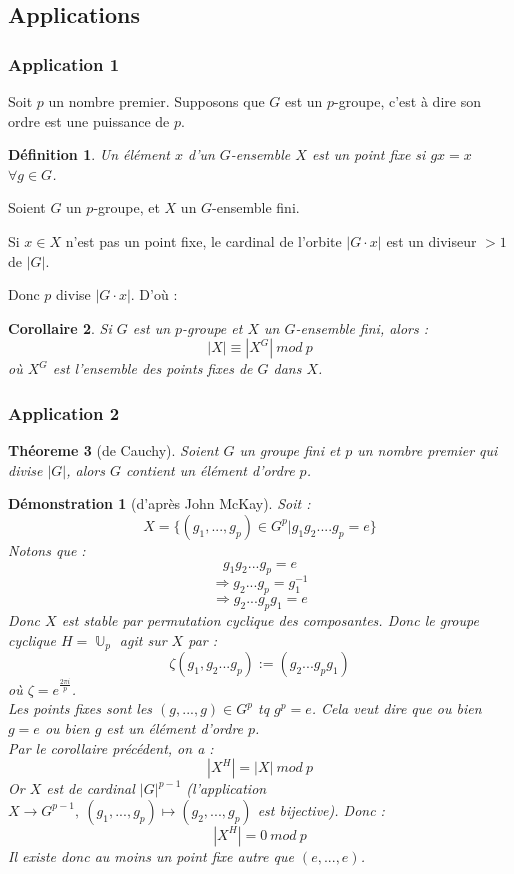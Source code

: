 \documentclass[a4paper, oneside]{report}
\theoremstyle{break}
\newtheorem{thm}{Théoreme}[section] %
\newtheorem{defi}[thm]{Définition}
\newtheorem{cor}[thm]{Corollaire}
\newtheorem*{demo}{Démonstration}
\DeclareMathOperator{\U}{\mathbb{U}}
\begin{document}
\subsection{Applications}

\subsubsection{Application 1}

Soit $p$ un nombre premier. Supposons que $G$ est un $p$-groupe, c'est à dire son ordre est une puissance de $p$.

\begin{defi}
	Un élément $x$ d'un $G$-ensemble $X$ est un point fixe si $gx=x$ $\forall g\in G$.
\end{defi}

Soient $G$ un $p$-groupe, et $X$ un $G$-ensemble fini.

Si $x\in X$ n'est pas un point fixe, le cardinal de l'orbite $|G \cdot x|$ est un diviseur $>1$ de $|G|$.

Donc $p$ divise $|G \cdot x|$. D'où :

\begin{cor}
	Si $G$ est un $p$-groupe et $X$ un $G$-ensemble fini, alors :
	$$|X| \equiv |X^G|~mod~p$$
	où $X^G$ est l'ensemble des points fixes de $G$ dans $X$.
\end{cor}

\subsubsection{Application 2}

\begin{thm}[de Cauchy]
	Soient $G$ un groupe fini et $p$ un nombre premier qui divise $|G|$, alors $G$ contient un élément d'ordre $p$.
\end{thm}

\begin{demo}[d'après John McKay]
	Soit :
	$$X=\{(g_1,...,g_p)\in G^p | g_1g_2....g_p =e \}$$
	Notons que :
	$$g_1g_2...g_p = e$$
	$$\Rightarrow g_2...g_p=g_1^{-1}$$
	$$\Rightarrow g_2...g_pg_1=e$$
	Donc $X$ est stable par permutation cyclique des composantes. Donc le groupe cyclique $H=\U_p$ agit sur $X$ par :
	$$\zeta(g_1,g_2...g_p) := (g_2...g_pg_1)$$
	où $\zeta = e^{\frac{2\pi i}{p}}$.\\
	Les points fixes sont les $(g,...,g)\in G^p$ tq $g^p=e$. Cela veut dire que ou bien $g=e$ ou bien $g$ est un élément d'ordre $p$.\\
	Par le corollaire précédent, on a :
	$$|X^H|=|X|~mod~p$$
	Or $X$ est de cardinal $|G|^{p-1}$ (l'application $X \rightarrow G^{p-1},~(g_1,...,g_p)\mapsto (g_2,...,g_p)$ est bijective). Donc :
	$$|X^H|=0~mod~p$$
	Il existe donc au moins un point fixe autre que $(e,...,e)$.	
\end{demo}
\end{document}
